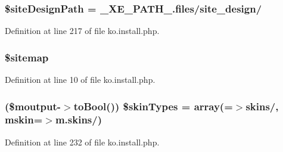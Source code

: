 \hypertarget{ko_8install_8php_a0b79a974b91157b79d83cc0be7e3247c}{}
\subsubsection[{\$site\+Design\+Path}]{\setlength{\rightskip}{0pt plus 5cm}\$site\+Design\+Path = \+\_\+\+X\+E\+\_\+\+P\+A\+T\+H\+\_\+.\textquotesingle{}files/site\+\_\+design/\textquotesingle{}}\label{ko_8install_8php_a0b79a974b91157b79d83cc0be7e3247c}


Definition at line 217 of file ko.\+install.\+php.

\hypertarget{ko_8install_8php_ae7b8fee391a6d8b9162de5b69b9dc07f}{}
\subsubsection[{\$sitemap}]{\setlength{\rightskip}{0pt plus 5cm}\$sitemap}\label{ko_8install_8php_ae7b8fee391a6d8b9162de5b69b9dc07f}


Definition at line 10 of file ko.\+install.\+php.

\hypertarget{ko_8install_8php_aa61073b7b359568eb3459da113fd8cdf}{}
\subsubsection[{\$skin\+Types}]{ (\$moutput-\/$>$to\+Bool()) \$skin\+Types = array(\textquotesingle{}=$>$\textquotesingle{}skins/\textquotesingle{}, \textquotesingle{}mskin\textquotesingle{}=$>$\textquotesingle{}m.\+skins/\textquotesingle{})}\label{ko_8install_8php_aa61073b7b359568eb3459da113fd8cdf}


Definition at line 232 of file ko.\+install.\+php.

\hypertarget{ko_8install_8php_a41d95a71ebf0758e83224ab4bb3a31c0}{}
